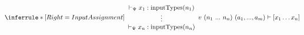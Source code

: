 \begin{equation*}
    \inferrule*[Right=InputAssignment]
    {
        {\begin{array}{c}
            \vdash_\networkTheoryVar \networkInput_1 : \networkInputsType(\networkDeclVar_1) \\ 
            \vdots \\ 
            \vdash_\networkTheoryVar \networkInput_n : \networkInputsType(\networkDeclVar_n)
        \end{array}}
    }
    {
        \queryExpansion \vdash \networkInputs
    }
\end{equation*}
